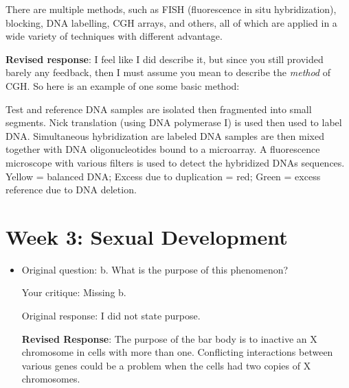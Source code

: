 \documentclass[basic,plain]{inVerba-notes}
\begin{document}
\begin{itemize}
{    There are multiple methods, such as FISH (fluorescence in situ hybridization), blocking, DNA labelling, CGH arrays, and others, all of which are applied in a wide variety of techniques with different advantage.}

    \textbf{Revised response}: I feel like I did describe it, but since you still provided barely any feedback, then I must assume you mean to describe the \textit{method} of CGH\@. So here is an example of one some basic method: 

    Test and reference DNA samples are isolated then fragmented into small segments. Nick translation (using DNA polymerase I) is used then used to label DNA\@. Simultaneous hybridization are labeled DNA samples are then mixed together with DNA oligonucleotides bound to a microarray. A fluorescence microscope with various filters is used to detect the hybridized DNAs sequences. Yellow = balanced DNA; Excess due to duplication = red; Green = excess reference due to DNA deletion.
\end{itemize}

\section{Week 3: Sexual Development}
\begin{itemize}
    \item Original question: b. What is the purpose of this phenomenon?
    
    Your critique: Missing b.

    Original response: I did not state purpose.

    \textbf{Revised Response}: The purpose of the bar body is to inactive an X chromosome in cells with more than one. Conflicting interactions between various genes could be a problem when the cells had two copies of X chromosomes. 
\end{itemize}




\end{document}
